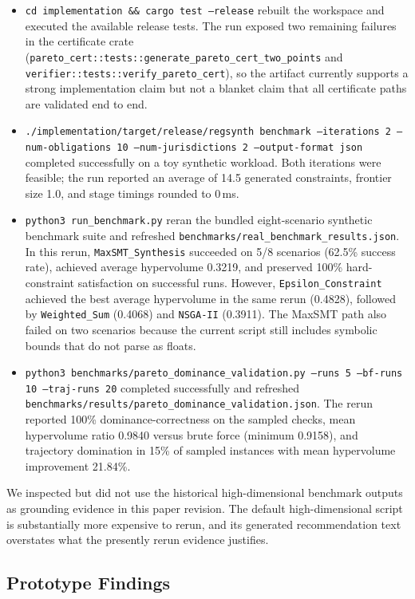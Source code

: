 \documentclass[11pt,twocolumn]{article}
\begin{document}
\begin{itemize}[leftmargin=*]
  \item \texttt{cd implementation \&\& cargo test --release} rebuilt the workspace and executed the available release tests. The run exposed two remaining failures in the certificate crate (\texttt{pareto\_cert::tests::generate\_pareto\_cert\_two\_points} and \texttt{verifier::tests::verify\_pareto\_cert}), so the artifact currently supports a strong implementation claim but not a blanket claim that all certificate paths are validated end to end.
  \item \texttt{./implementation/target/release/regsynth benchmark --iterations 2 --num-obligations 10 --num-jurisdictions 2 --output-format json} completed successfully on a toy synthetic workload. Both iterations were feasible; the run reported an average of 14.5 generated constraints, frontier size 1.0, and stage timings rounded to 0\,ms.
  \item \texttt{python3 run\_benchmark.py} reran the bundled eight-scenario synthetic benchmark suite and refreshed \texttt{benchmarks/real\_benchmark\_results.json}. In this rerun, \texttt{MaxSMT\_Synthesis} succeeded on 5/8 scenarios (62.5\% success rate), achieved average hypervolume 0.3219, and preserved 100\% hard-constraint satisfaction on successful runs. However, \texttt{Epsilon\_Constraint} achieved the best average hypervolume in the same rerun (0.4828), followed by \texttt{Weighted\_Sum} (0.4068) and \texttt{NSGA-II} (0.3911). The MaxSMT path also failed on two scenarios because the current script still includes symbolic bounds that do not parse as floats.
  \item \texttt{python3 benchmarks/pareto\_dominance\_validation.py --runs 5 --bf-runs 10 --traj-runs 20} completed successfully and refreshed \texttt{benchmarks/results/pareto\_dominance\_validation.json}. The rerun reported 100\% dominance-correctness on the sampled checks, mean hypervolume ratio 0.9840 versus brute force (minimum 0.9158), and trajectory domination in 15\% of sampled instances with mean hypervolume improvement 21.84\%.
\end{itemize}

We inspected but did not use the historical high-dimensional benchmark outputs as grounding evidence in this paper revision. The default high-dimensional script is substantially more expensive to rerun, and its generated recommendation text overstates what the presently rerun evidence justifies.

\subsection{Prototype Findings}
\end{document}
